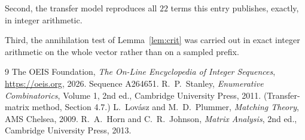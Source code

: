 \documentclass[11pt,a4paper]{article}
\theoremstyle{plain}
\theoremstyle{definition}
\begin{document}
Second, the transfer model reproduces all $22$ terms this entry publishes, exactly, in
integer arithmetic.

Third, the annihilation test of Lemma~\ref{lem:crit} was carried out in exact integer
arithmetic on the whole vector rather than on a sampled prefix.

\begin{thebibliography}{9}
 The OEIS Foundation, \emph{The On-Line Encyclopedia of Integer
Sequences}, \url{https://oeis.org}, 2026. Sequence A264651.
 R.~P.~Stanley, \emph{Enumerative Combinatorics}, Volume 1, 2nd ed.,
Cambridge University Press, 2011. (Transfer-matrix method, Section 4.7.)
 L.~Lov\'asz and M.~D.~Plummer, \emph{Matching Theory}, AMS Chelsea, 2009.
 R.~A.~Horn and C.~R.~Johnson, \emph{Matrix Analysis}, 2nd ed., Cambridge
University Press, 2013.
\end{thebibliography}
\end{document}
